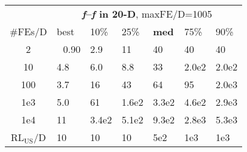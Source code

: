 \begin{tabular}{c|llllll}
 & \multicolumn{6}{|c}{\textbf{\textit{f}\raisebox{-0.35ex}{1}--\textit{f}\raisebox{-0.35ex}{24} in 20-D}, maxFE/D=1005}\\
\#FEs/D & best & 10\% & 25\% & \textbf{med} & 75\% & 90\%\\
2 & ~\,0.90 & \hspace*{1ex}2.9 & 11 & 40 & 40 & 40\\
10 & \hspace*{1ex}4.8 & \hspace*{1ex}6.0 & \hspace*{1ex}8.8 & 33 & 2.0e2 & 2.0e2\\
100 & \hspace*{1ex}3.7 & 16 & 43 & 64 & 95 & 2.0e3\\
1e3 & \hspace*{1ex}5.0 & 61 & 1.6e2 & 3.3e2 & 4.6e2 & 2.9e3\\
1e4 & 11 & 3.4e2 & 5.1e2 & 9.3e2 & 2.8e3 & 5.3e3\\
$\text{RL}_{\text{US}}$/D & 10 & 10 & 10 & 5e2 & 1e3 & 1e3
\end{tabular}
